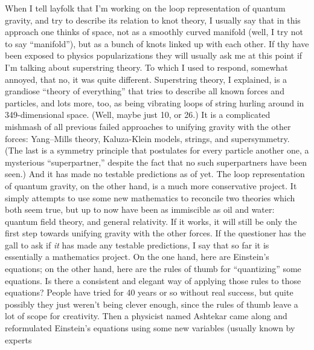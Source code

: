 \documentclass{article}
\def\tightlist{}
\renewcommand{\texttt}[1]{%
  \begingroup
  \ttfamily
  \begingroup\lccode`~=`/\lowercase{\endgroup\def~}{/\discretionary{}{}{}}%
  \begingroup\lccode`~=`[\lowercase{\endgroup\def~}{[\discretionary{}{}{}}%
  \begingroup\lccode`~=`.\lowercase{\endgroup\def~}{.\discretionary{}{}{}}%
  \catcode`/=\active\catcode`[=\active\catcode`.=\active
  \scantokens{#1\noexpand}%
  \endgroup
}
\begin{document}
\noindent
When I tell layfolk that I'm working on the loop representation of
quantum gravity, and try to describe its relation to knot theory, I
usually say that in this approach one thinks of space, not as a smoothly
curved manifold (well, I try not to say ``manifold''), but as a bunch of
knots linked up with each other. If thy have been exposed to physics
popularizations they will usually ask me at this point if I'm talking
about superstring theory. To which I used to respond, somewhat annoyed,
that no, it was quite different. Superstring theory, I explained, is a
grandiose ``theory of everything'' that tries to describe all known
forces and particles, and lots more, too, as being vibrating loops of
string hurling around in 349-dimensional space. (Well, maybe just 10, or
26.) It is a complicated mishmash of all previous failed approaches to
unifying gravity with the other forces: Yang--Mills theory, Kaluza-Klein
models, strings, and supersymmetry. (The last is a symmetry principle
that postulates for every particle another one, a mysterious
``superpartner,'' despite the fact that no such superpartners have been
seen.) And it has made no testable predictions as of yet. The loop
representation of quantum gravity, on the other hand, is a much more
conservative project. It simply attempts to use some new mathematics to
reconcile two theories which both seem true, but up to now have been as
immiscible as oil and water: quantum field theory, and general
relativity. If it works, it will still be only the first step towards
unifying gravity with the other forces. If the questioner has the gall
to ask if \emph{it} has made any testable predictions, I say that so far
it is essentially a mathematics project. On the one hand, here are
Einstein's equations; on the other hand, here are the rules of thumb for
``quantizing'' some equations. Is there a consistent and elegant way of
applying those rules to those equations? People have tried for 40 years
or so without real success, but quite possibly they just weren't being
clever enough, since the rules of thumb leave a lot of scope for
creativity. Then a physicist named Ashtekar came along and reformulated
Einstein's equations using some new variables (usually known by experts
\end{document}
